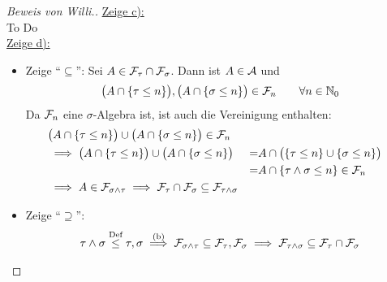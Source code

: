 \documentclass[12pt,a4paper]{article}
\begin{document}
\begin{proof}[Beweis von Willi.]
\underline{Zeige c):}\\
To Do\\

\underline{Zeige d):}\\
\begin{itemize}
\item Zeige ``$\subseteq$'':
Sei $A\in\mathcal{F}_\tau\cap\mathcal{F}_\sigma$. Dann ist $A\in\mathcal{A}$ und
\begin{align*}
\big(A\cap\lbrace\tau\leq n\rbrace\big),\big(A\cap\lbrace\sigma\leq n\rbrace\big)\in\mathcal{F}_n\qquad\forall n\in\mathbb{N}_0
\end{align*}
Da $\mathcal{F}_n$ eine $\sigma$-Algebra ist, ist auch die Vereinigung enthalten:
\begin{align*}
&\big(A\cap\lbrace\tau\leq n\rbrace\big)\cup\big(A\cap\lbrace\sigma\leq n\rbrace\big)\in\mathcal{F}_n\\
&\implies
\big(A\cap\lbrace\tau\leq n\rbrace\big)\cup\big(A\cap\lbrace\sigma\leq n\rbrace\big)
&=&A\cap\big(\lbrace\tau\leq n\rbrace\cup\lbrace\sigma\leq n\rbrace\big)\\
&&=&A\cap\lbrace\tau\wedge\sigma\leq n\rbrace\in\mathcal{F}_n\\
&\implies A\in\mathcal{F}_{\sigma\wedge\tau}\implies \mathcal{F}_\tau\cap\mathcal{F}_\sigma\subseteq\mathcal{F}_{\tau\wedge\sigma}
\end{align*}

\item Zeige ``$\supseteq$'':
\begin{align*}
\tau\wedge\sigma\stackrel{\text{Def}}{\leq}\tau,\sigma\stackrel{\text{(b)}}{\implies}\mathcal{F}_{\sigma\wedge\tau}\subseteq\mathcal{F}_\tau,\mathcal{F}_\sigma\implies\mathcal{F}_{\tau\wedge\sigma}\subseteq\mathcal{F}_\tau\cap\mathcal{F}_\sigma
\end{align*}
\end{itemize}
\end{proof}
\end{document}
